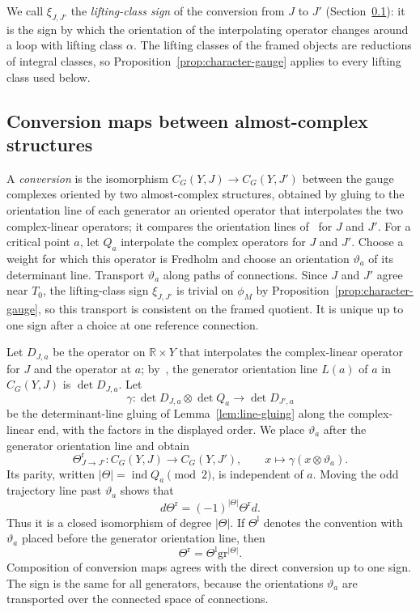 \documentclass[11pt]{amsart}
\theoremstyle{definition}
\theoremstyle{remark}
\theoremstyle{plain}
\numberwithin{equation}{section}
\newcommand{\RR}{\mathbb R}
\newcommand{\eps}{\mathrm{gr}}
\newcommand{\ind}{\operatorname{ind}}
\begin{document}
We call $\xi_{J,J'}$ the \emph{lifting-class sign} of the conversion
from $J$ to $J'$ (Section~\ref{subsec:conversion}): it is the sign by
which the orientation of the interpolating operator changes around a
loop with lifting class $\alpha$. The lifting classes of the framed
objects are reductions of integral classes, so
Proposition~\ref{prop:character-gauge} applies to every lifting class
used below.

\subsection{Conversion maps between almost-complex structures}
\label{subsec:conversion}
A \emph{conversion} is the isomorphism $C_G(Y,J)\to C_G(Y,J')$
between the gauge complexes oriented by two almost-complex
structures, obtained by gluing to the orientation line of each
generator an oriented operator that interpolates the two
complex-linear operators; it compares the orientation lines
of~\cite[Section~5.1]{KM-unknot} for $J$ and $J'$. For a critical
point $a$, let $Q_a$ interpolate the complex operators for $J$ and
$J'$. Choose a weight for which this operator is Fredholm and choose
an orientation $\vartheta_a$ of its determinant line. Transport
$\vartheta_a$ along paths of connections. Since $J$ and $J'$ agree
near $T_0$, the lifting-class sign $\xi_{J,J'}$ is trivial on $\phi_M$
by Proposition~\ref{prop:character-gauge}, so this transport is
consistent on the framed quotient. It is unique up to one
sign after a choice at one reference connection.

Let $D_{J,a}$ be the operator on $\RR\times Y$ that interpolates the
complex-linear operator for $J$ and the operator at $a$;
by~\cite[Section~5.1]{KM-unknot}, the generator orientation line $L(a)$
of $a$ in $C_G(Y,J)$ is $\det D_{J,a}$. Let
\[
 \gamma:\det D_{J,a}\otimes\det Q_a\longrightarrow\det D_{J',a}
\]
be the determinant-line gluing of Lemma~\ref{lem:line-gluing} along the
complex-linear end, with the factors in the displayed order. We place
$\vartheta_a$ after the generator orientation line and obtain
\begin{equation}\label{eq:Theta}
 \Theta^{\mathrm r}_{J\to J'}:
 C_G(Y,J)\longrightarrow C_G(Y,J'),\qquad
 x\longmapsto\gamma(x\otimes\vartheta_a).
\end{equation}
Its parity, written $|\Theta|=\ind Q_a\pmod2$, is independent of $a$. Moving
the odd trajectory line past $\vartheta_a$ shows that
\[
 d\Theta^{\mathrm r}=(-1)^{|\Theta|}\Theta^{\mathrm r}d.
\]
Thus it is a closed isomorphism of degree $|\Theta|$. If
$\Theta^{\mathrm l}$ denotes the convention with $\vartheta_a$ placed
before the generator orientation line, then
\begin{equation}\label{eq:theta-grading}
 \Theta^{\mathrm r}=\Theta^{\mathrm l}\eps^{|\Theta|}.
\end{equation}
Composition of conversion maps agrees with the direct
conversion up to one sign. The sign is the same for all
generators, because the orientations $\vartheta_a$ are transported
over the connected space of connections.
\end{document}

